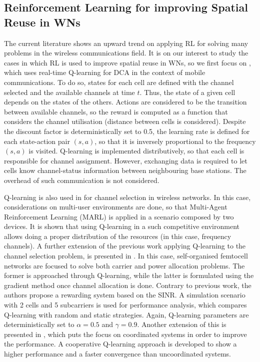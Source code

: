 \documentclass[12pt, a4paper,twoside]{tesi_upf}
\begin{document}
			\subsection{Reinforcement Learning for improving Spatial Reuse in WNs}		
			\label{tbl:rl_to_wns}
				The current literature shows an upward trend on applying RL for solving many problems in the wireless communications field. It is on our interest to study the cases in which RL is used to improve spatial reuse in WNs, so we first focus on \cite{nie1999q}, which uses real-time Q-learning for DCA in the context of mobile communications. To do so, states for each cell are defined with the channel selected and the available channels at time $t$. Thus, the state of a given cell depends on the states of the others. Actions are considered to be the transition between available channels, so the reward is computed as a function that considers the channel utilisation (distance between cells is considered). Despite the discount factor is deterministically set to 0.5, the learning rate is defined for each state-action pair $(s,a)$, so that it is inversely proportional to the frequency $(s,a)$ is visited. Q-learning is implemented distributively, so that each cell is responsible for channel assignment. However, exchanging data is required to let cells know channel-status information between neighbouring base stations. The overhead of such communication is not considered. 
				
				Q-learning is also used in \cite{li2009multi} for channel selection in wireless networks. In this case, considerations on multi-user environments are done, so that Multi-Agent Reinforcement Learning (MARL) is applied in a scenario composed by two devices. It is shown that using Q-learning in a such competitive environment allows doing a proper distribution of the resources (in this case, frequency channels). A further extension of the previous work applying Q-learning to the channel selection problem, is presented in \cite{bennis2010q}. In this case, self-organised femtocell networks are focused to solve both carrier and power allocation problems. The former is approached through Q-learning, while the latter is formulated using the gradient method once channel allocation is done. Contrary to previous work, the authors propose a rewarding system based on the SINR. A simulation scenario with 2 cells and 5 subcarriers is used for performance analysis, which compares Q-learning with random and static strategies. Again, Q-learning parameters are deterministically set to $\alpha = 0.5$ and $\gamma = 0.9$.	Another extension of this is presented in \cite{bennis2011distributed}, which puts the focus on coordinated systems in order to improve the performance. A cooperative Q-learning approach is developed to show a higher performance and a faster convergence than uncoordinated systems.
					
\end{document}
